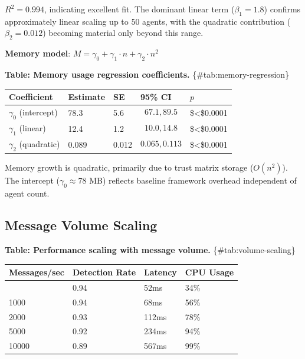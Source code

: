 \documentclass[
]{article}
\newcounter{none} %
\begin{document}
\(R^2 = 0.994\), indicating excellent fit. The dominant linear term
(\(\beta_1 = 1.8\)) confirms approximately linear scaling up to 50
agents, with the quadratic contribution (\(\beta_2 = 0.012\)) becoming
material only beyond this range.

\textbf{Memory model}:
\(M = \gamma_0 + \gamma_1 \cdot n + \gamma_2 \cdot n^2\)

\textbf{Table: Memory usage regression coefficients.}
\{\#tab:memory-regression\}

{\def\LTcaptype{none} %
\begin{longtable}[]{@{}lllll@{}}
\toprule\noalign{}
Coefficient & Estimate & SE & 95\% CI & \(p\) \\
\midrule\noalign{}
\endhead
\bottomrule\noalign{}
\endlastfoot
\(\gamma_0\) (intercept) & 78.3 & 5.6 & \[67.1, 89.5\] &
\$\textless\$0.0001 \\
\(\gamma_1\) (linear) & 12.4 & 1.2 & \[10.0, 14.8\] &
\$\textless\$0.0001 \\
\(\gamma_2\) (quadratic) & 0.089 & 0.012 & \[0.065, 0.113\] &
\$\textless\$0.0001 \\
\end{longtable}
}

Memory growth is quadratic, primarily due to trust matrix storage
(\(O(n^2)\)). The intercept (\(\gamma_0 \approx 78\) MB) reflects
baseline framework overhead independent of agent count.

\subsection{Message Volume Scaling}\label{sec:volume-scaling}

\textbf{Table: Performance scaling with message volume.}
\{\#tab:volume-scaling\}

{\def\LTcaptype{none} %
\begin{longtable}[]{@{}llll@{}}
\toprule\noalign{}
Messages/sec & Detection Rate & Latency & CPU Usage \\
\midrule\noalign{}
\endhead
\bottomrule\noalign{}
\endlastfoot
500 & 0.94 & 52ms & 34\% \\
1000 & 0.94 & 68ms & 56\% \\
2000 & 0.93 & 112ms & 78\% \\
5000 & 0.92 & 234ms & 94\% \\
10000 & 0.89 & 567ms & 99\% \\
\end{longtable}
}
\end{document}
